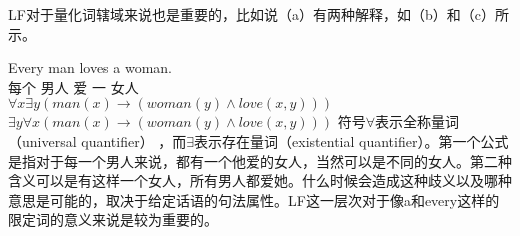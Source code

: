 LF对于量化词辖域来说也是重要的，比如说（a）有两种解释，如（b）和（c）所示。

\eal
\label{Beispiel-Every-man-loves-a-woman}
\ex 
\gll Every man loves a woman.\\
每个 男人 爱 一 女人\\
\ex $\forall x \exists y (man(x) \to (woman(y) \wedge love(x,y)))$
\ex $\exists y \forall x (man(x) \to (woman(y) \wedge love(x,y)))$
\zl
符号$\forall$\isc{$\forall$}\is{$\forall$}表示全称量词（universal quantifier） ，而$\exists$\isc{$\exists$}\is{$\exists$}表示存在量词（existential
quantifier）。第一个公式是指对于每一个男人来说，都有一个他爱的女人，当然可以是不同的女人。第二种含义可以是有这样一个女人，所有男人都爱她。什么时候会造成这种歧义以及哪种意思是可能的，取决于给定话语的句法属性。LF这一层次对于像a和every这样的限定词的意义来说是较为重要的。


